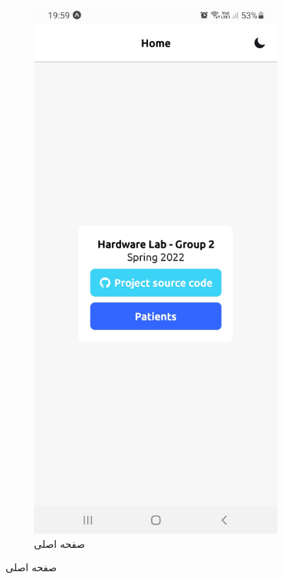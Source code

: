 \documentclass[12pt]{article}
\begin{document}
\begin{figure}[H]
	\begin{center}
		\begin{subfigure}{.45\textwidth}
			\includegraphics[width=.9\linewidth]{app_home}
			\caption{صفحه اصلی}
		\end{subfigure}

\end{center}
\end{figure}
\end{document}
